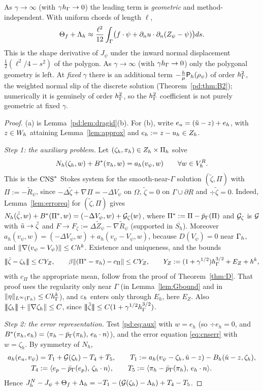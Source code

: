 As $\gamma\to\infty$ (with $\gamma h_\Gamma\to0$) the leading term is \emph{geometric} and method-independent. With uniform chords of length $\ell$,
\[
\Theta_f+\Lambda_h\approx\frac{\ell^2}{12}\int_\Gamma\bigl(f\cdot\psi+\partial_n u\cdot\partial_n(Z_\psi-\psi)\bigr)ds .
\]
This is the shape derivative of $J_\psi$ under the inward normal displacement $\frac12(\ell^2/4-s^2)$ of the polygon. As $\gamma\to\infty$ (with $\gamma h_\Gamma\to0$) only the polygonal geometry is left. At \emph{fixed} $\gamma$ there is an additional term $-\frac h\mu\mathsf P_h(\rho_\psi)$ of order $h_\Gamma^2$, the weighted normal slip of the discrete solution (Theorem~\ref{pd:thm:B2}); numerically it is genuinely of order $h_\Gamma^2$, so the $h_\Gamma^2$ coefficient is not purely geometric at fixed $\gamma$.

\begin{proof}
(a) is Lemma~\ref{pd:lem:dragid}(b). For (b), write $e_u=(\tilde u-z)+e_h$, with $z\in W_h$ attaining Lemma~\ref{lem:approx} and $e_h:=z-u_h\in Z_h$.

\emph{Step 1: the auxiliary problem.} Let $(\zeta_h,\pi_h)\in Z_h\times\Pi_h$ solve
\begin{equation}\label{pd:eq:aux}
N_h(\zeta_h,w)+B^\ast(\pi_h,w)=a_h(v_\psi,w)\qquad\forall w\in V_h^R .
\end{equation}
This is the $\mathrm{CNS}^\ast$ Stokes system for the smooth-near-$\Gamma$ solution $(\tilde\zeta,\Pi)$ with $\Pi:=-\tilde R_\psi$, since $-\Delta\tilde\zeta+\nabla\Pi=-\Delta V_\psi$ on $\Omega$, $\tilde\zeta=0$ on $\Gamma\cup\partial R$ and $\div\tilde\zeta=0$. Indeed, Lemma~\ref{lem:erroreq} for $(\tilde\zeta,\Pi)$ gives $N_h(\tilde\zeta,w)+B^\ast(\Pi^\ast,w)=(-\Delta V_\psi,w)+\mathcal G_\zeta(w)$, where $\Pi^\ast:=\Pi-\bar p_{\Gamma}(\Pi)$ and $\mathcal G_\zeta$ is $\mathcal G$ with $\tilde u\to\tilde\zeta$ and $F\to F_\zeta:=\Delta\tilde Z_\psi-\nabla\tilde R_\psi$ (supported in $\overline{S_h}$). Moreover $a_h(v_\psi,w)=(-\Delta V_\psi,w)+a_h(v_\psi-V_\psi,w)$, because $D(V_\psi)=0$ near $\Gamma_h$, and $\lVert \nabla(v_\psi-V_\psi)\rVert\le Ch^k$. Existence and uniqueness, and the bounds
\[
|\!|\!|\tilde\zeta-\zeta_h|\!|\!|\le CY_Z,\qquad\beta\lVert (\Pi^\ast-\pi_h)-c_\Pi\rVert\le CY_Z,\qquad Y_Z:=(1+\gamma^{1/2})h_\Gamma^{3/2}+E_Z+h^k,
\]
with $c_\Pi$ the appropriate mean, follow from the proof of Theorem~\ref{thm:D}. That proof uses the regularity only near $\Gamma$ (in Lemma~\ref{lem:Gbound} and in $\lVert \eta\rVert_{L^\infty(\Gamma_h)}\le Ch_\Gamma^k$), and $\varepsilon_h$ enters only through $E_h$, here $E_Z$. Also $|\!|\!|\zeta_h|\!|\!|+\lVert \nabla\zeta_h\rVert\le C$, since $|\!|\!|\tilde\zeta|\!|\!|\le C(1+\gamma^{1/2}h_\Gamma^{3/2})$.

\emph{Step 2: the error representation.} Test \eqref{pd:eq:aux} with $w=e_h$ (so $\div e_h=0$, and $B^\ast(\pi_h,e_h)=\langle \pi_h-\bar p_{\Gamma}(\pi_h),\, e_h\cdot n\rangle$), and the error equation \eqref{eq:cnserr} with $w=\zeta_h$. By symmetry of $N_h$,
\[
\begin{aligned}
a_h(e_u,v_\psi)&=T_1+\mathcal G(\zeta_h)-T_4+T_5,\qquad T_1:=a_h(v_\psi-\zeta_h,\tilde u-z)-B_h(\tilde u-z,\zeta_h),\\
T_4&:=\langle e_p-\bar p_{\Gamma}(e_p),\, \zeta_h\cdot n\rangle,\qquad T_5:=\langle \pi_h-\bar p_{\Gamma}(\pi_h),\, e_h\cdot n\rangle.
\end{aligned}
\]
Hence $J^N_h-J_\psi+\Theta_f+\Lambda_h=-T_1-(\mathcal G(\zeta_h)-\Lambda_h)+T_4-T_5$.


\end{proof}
